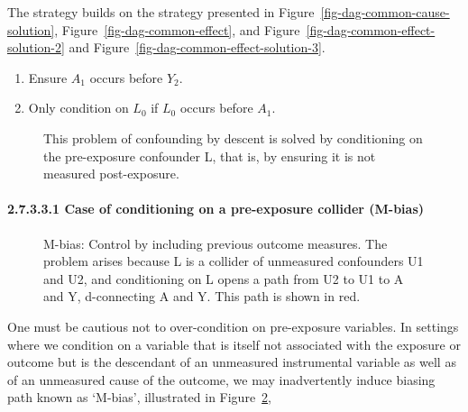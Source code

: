 \documentclass[
  singlecolumn]{article}
\let\oldparagraph\paragraph
\renewcommand{\paragraph}[1]{\oldparagraph{#1}\mbox{}}
\providecommand{\tightlist}{%
  \setlength{\itemsep}{0pt}\setlength{\parskip}{0pt}}\usepackage{longtable,booktabs,array}
\begin{document}
The strategy builds on the strategy presented in
Figure~\ref{fig-dag-common-cause-solution},
Figure~\ref{fig-dag-common-effect}, and
Figure~\ref{fig-dag-common-effect-solution-2} and
Figure~\ref{fig-dag-common-effect-solution-3}.

\begin{enumerate}
\def\labelenumi{\arabic{enumi}.}
\tightlist
\item
  Ensure \(A_1\) occurs before \(Y_2\).
\item
  Only condition on \(L_0\) if \(L_0\) occurs before \(A_1\).
\end{enumerate}

\begin{figure}


\caption{\label{fig-dag-descendant-solution}This problem of confounding
by descent is solved by conditioning on the pre-exposure confounder L,
that is, by ensuring it is not measured post-exposure.}

\end{figure}%

\paragraph{2.7.3.3.1 Case of conditioning on a pre-exposure collider
(M-bias)}\label{case-of-conditioning-on-a-pre-exposure-collider-m-bias}

\begin{figure}


\caption{\label{fig-m-bias}M-bias: Control by including previous outcome
measures. The problem arises because L is a collider of unmeasured
confounders U1 and U2, and conditioning on L opens a path from U2 to U1
to A and Y, d-connecting A and Y. This path is shown in red.}

\end{figure}%

One must be cautious not to over-condition on pre-exposure variables. In
settings where we condition on a variable that is itself not associated
with the exposure or outcome but is the descendant of an unmeasured
instrumental variable as well as of an unmeasured cause of the outcome,
we may inadvertently induce biasing path known as `M-bias', illustrated
in Figure~\ref{fig-m-bias},
\end{document}

